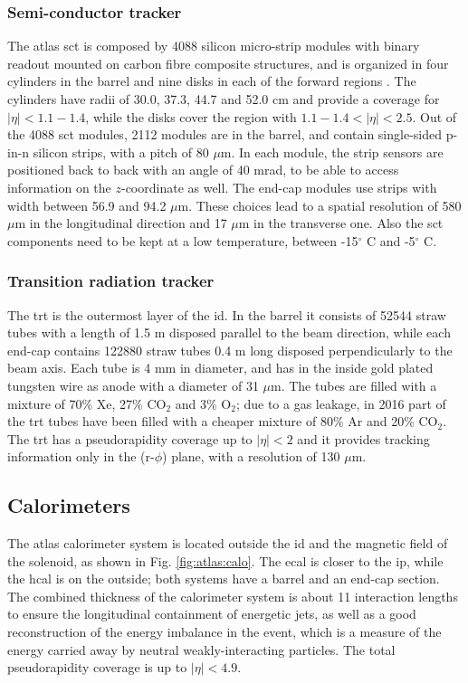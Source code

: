 \subsubsection*{Semi-conductor tracker}
The \gls{atlas} \gls{sct} is composed by 4088 silicon micro-strip modules with binary readout mounted on carbon fibre composite structures, and is organized in four cylinders in the barrel and nine disks in each of the forward regions \cite{Jackson:sct}. The cylinders have  radii of 30.0, 37.3, 44.7 and 52.0 cm and provide a coverage for $|\eta|<1.1-1.4$, while the disks cover the region with $1.1-1.4<|\eta|<2.5$. 
Out of the 4088 \gls{sct} modules, 2112 modules are in the barrel, 
and contain single-sided p-in-n silicon strips, with a pitch of 80 $\mu$m. 
In each module, the strip sensors are positioned back to back with an angle of 40 mrad, to be able to access information on the $z$-coordinate as well. The end-cap modules use strips with width between 56.9 and 94.2 $\mu$m. 
These choices lead to a spatial resolution of 580 $\mu$m in the longitudinal direction and 17 $\mu$m in the transverse one.
Also the \gls{sct} components need to be kept at a low temperature, between -15$^{\circ}$ C and -5$^{\circ}$ C.

\subsubsection*{Transition radiation tracker}

The \gls{trt} is the outermost layer of the \gls{id}. In the barrel it consists of 52544 straw tubes with a length of 1.5 m disposed parallel to the beam direction, while each end-cap contains 122880 straw tubes 0.4 m long disposed perpendicularly to the beam axis. Each tube is 4 mm in diameter, and has in the inside gold plated tungsten wire as anode with a diameter of 31 $\mu$m. The tubes are filled with a mixture of 70\% Xe, 27\% CO$_2$ and 3\% O$_2$; due to a gas leakage, in 2016 part of the \gls{trt} tubes have been filled with a cheaper mixture of 80\% Ar and 20\% CO$_2$. The \gls{trt} has a pseudorapidity coverage up to $|\eta|<2$ and it provides tracking information only in the (r-$\phi$) plane, with a resolution of 130 $\mu$m.


\subsection{Calorimeters}
\label{sec:atlas:calo}

The \gls{atlas} calorimeter system is located outside the \gls{id} and the magnetic field of the solenoid, as shown in Fig. \ref{fig:atlas:calo}. The \gls{ecal} is closer to the \gls{ip}, while the \gls{hcal} is on the outside; both systems have a barrel and an end-cap section. 
The combined thickness of the calorimeter system is about 11 interaction lengths to ensure the longitudinal containment of energetic jets, 
as well as a good reconstruction of the energy imbalance in the event, which is a measure of the energy carried away by neutral weakly-interacting particles. The total pseudorapidity coverage is up to $|\eta|<4.9$. 

